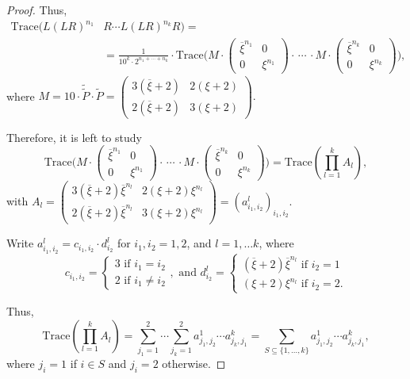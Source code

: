 \documentclass[10pt,a4paper]{amsart}
\newcommand{\Tr}{\mathrm{Trace}}
\begin{document}
\begin{proof}
Thus,
\begin{align*}
\Tr(L(LR)^{n_1}&R\cdots L(LR)^{n_k}R)=\\ &=\frac{1}{10^{k}\cdot 2^{n_1+\cdots + n_k}}\cdot \Tr\Bigg(M\cdot \begin{pmatrix}
    \overline{\xi}^{n_1} & 0 \\ 0 & \xi^{n_1} 
\end{pmatrix}\cdot \, \cdots\, \cdot M\cdot \begin{pmatrix}
    \overline{\xi}^{n_k} & 0 \\ 0 & \xi^{n_k} 
\end{pmatrix} \Bigg),
\end{align*}
where $M=10\cdot \tilde{\tilde{P}}\cdot \tilde{P}=\begin{pmatrix}
    3(\overline{\xi}+2) & 2(\xi+2)\\ 2(\overline{\xi}+2) & 3(\xi+2)
\end{pmatrix}.$ 

Therefore, it is left to study 
\[
\Tr\Bigg(M\cdot \begin{pmatrix}
    \overline{\xi}^{n_1} & 0 \\ 0 & \xi^{n_1} 
\end{pmatrix}\cdot \, \cdots\, \cdot M\cdot \begin{pmatrix}
    \overline{\xi}^{n_k} & 0 \\ 0 & \xi^{n_k} 
\end{pmatrix} \Bigg)=\Tr(\prod_{l=1}^k A_l),
\]
with $A_l=\begin{pmatrix}
    3(\overline{\xi}+2)\overline{\xi}^{n_l} & 2(\xi+2)\xi^{n_l} \\ 2(\overline{\xi}+2)\overline{\xi}^{n_l} & 3(\xi+2)\xi^{n_l} 
\end{pmatrix}=(a_{i_1,i_2}^l)_{i_1,i_2}$.

Write $a_{i_1,i_2}^l=c_{i_1,i_2}\cdot d_{i_2}^l$ for $i_1,i_2=1,2$, and $l=1,\hdots k$,  where 
\[c_{i_1,i_2}=\begin{cases}
    3 \text{ if }i_1=i_2\\
    2 \text{ if }i_1\neq i_2
\end{cases}, \text{ and } d_{i_2}^l=\begin{cases}
    (\overline\xi+2)\overline\xi^{n_l}\text{ if }i_2=1 \\
    (\xi+2)\xi^{n_l}\text{ if }i_2=2.
\end{cases}
\]

Thus, 
\[
\Tr(\prod_{l=1}^k A_l)=\sum_{j_1=1}^2\cdots \sum_{j_k=1}^2 a_{j_1,j_2}^1\cdots a_{j_k,j_1}^k=\sum_{S\subseteq \{1,\hdots,k\}}a_{j_1,j_2}^1\cdots a_{j_k,j_1}^k, 
\]
where $j_i=1$ if $i\in S$ and $j_i=2$ otherwise. 


\end{proof}
\end{document}
